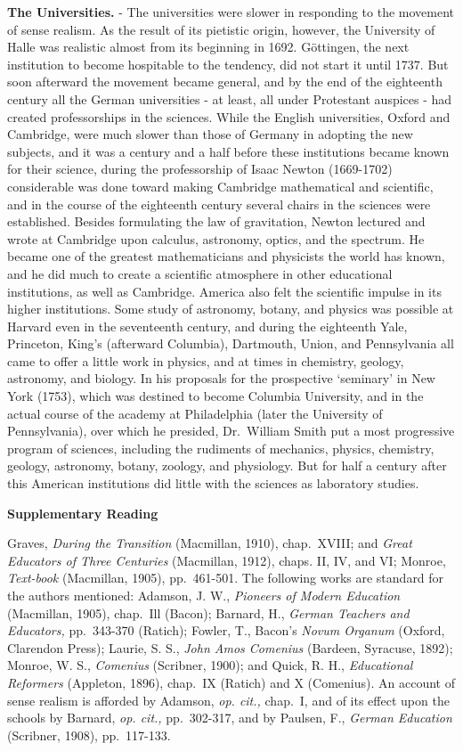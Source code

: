 \documentclass[
]{book}
\begin{document}
\textbf{The Universities.} - The universities were slower in responding to the movement of sense realism. As the result of its pietistic origin, however, the University of Halle was realistic almost from its beginning in 1692. Göttingen, the next institution to become hospitable to the tendency, did not start it until 1737. But soon afterward the movement became general, and by the end of the eighteenth century all the German universities - at least, all under Protestant auspices - had created professorships in the sciences. While the English universities, Oxford and Cambridge, were much slower than those of Germany in adopting the new subjects, and it was a century and a half before these institutions became known for their science, during the professorship of Isaac Newton (1669-1702) considerable was done toward making Cambridge mathematical and scientific, and in the course of the eighteenth century several chairs in the sciences were established. Besides formulating the law of gravitation, Newton lectured and wrote at Cambridge upon calculus, astronomy, optics, and the spectrum. He became one of the greatest mathematicians and physicists the world has known, and he did much to create a scientific atmosphere in other educational institutions, as well as Cambridge. America also felt the scientific impulse in its higher institutions. Some study of astronomy, botany, and physics was possible at Harvard even in the seventeenth century, and during the eighteenth Yale, Princeton, King's (afterward Columbia), Dartmouth, Union, and Pennsylvania all came to offer a little work in physics, and at times in chemistry, geology, astronomy, and biology. In his proposals for the prospective `seminary' in New York (1753), which was destined to become Columbia University, and in the actual course of the academy at Philadelphia (later the University of Pennsylvania), over which he presided, Dr.~William Smith put a most progressive program of sciences, including the rudiments of mechanics, physics, chemistry, geology, astronomy, botany, zoology, and physiology. But for half a century after this American institutions did little with the sciences as laboratory studies.

\textbf{Supplementary Reading}

Graves, \emph{During the Transition} (Macmillan, 1910), chap.~XVIII; and \emph{Great Educators of Three Centuries} (Macmillan, 1912), chaps. II, IV, and VI; Monroe, \emph{Text-book} (Macmillan, 1905), pp.~461-501. The following works are standard for the authors mentioned: Adamson, J. W., \emph{Pioneers of Modern Education} (Macmillan, 1905), chap.~Ill (Bacon); Barnard, H., \emph{German Teachers and Educators,} pp.~343-370 (Ratich); Fowler, T., Bacon's \emph{Novum Organum} (Oxford, Clarendon Press); Laurie, S. S., \emph{John Amos Comenius} (Bardeen, Syracuse, 1892); Monroe, W. S., \emph{Comenius} (Scribner, 1900); and Quick, R. H., \emph{Educational Reformers} (Appleton, 1896), chap.~IX (Ratich) and X (Comenius). An account of sense realism is afforded by Adamson, \emph{op. cit.,} chap.~I, and of its effect upon the schools by Barnard, \emph{op. cit.,} pp.~302-317, and by Paulsen, F., \emph{German Education} (Scribner, 1908), pp.~117-133.
\end{document}
